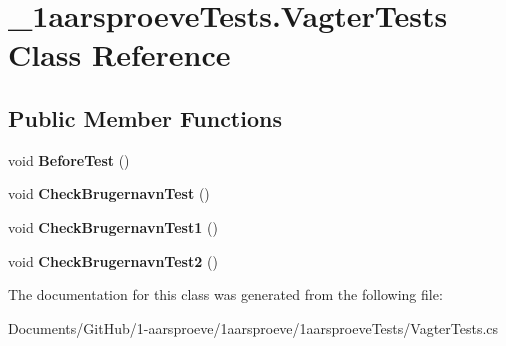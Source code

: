 \hypertarget{class__1aarsproeve_tests_1_1_vagter_tests}{}\section{\+\_\+1aarsproeve\+Tests.\+Vagter\+Tests Class Reference}
\label{class__1aarsproeve_tests_1_1_vagter_tests}
\subsection*{Public Member Functions}
\begin{DoxyCompactItemize}
\item 
\hypertarget{class__1aarsproeve_tests_1_1_vagter_tests_a2771308ae25fb3a3eda094c194c02466}{}void {\bfseries Before\+Test} ()\label{class__1aarsproeve_tests_1_1_vagter_tests_a2771308ae25fb3a3eda094c194c02466}

\item 
\hypertarget{class__1aarsproeve_tests_1_1_vagter_tests_a6925d5dfb2a8b7924ae3d6348a4a305a}{}void {\bfseries Check\+Brugernavn\+Test} ()\label{class__1aarsproeve_tests_1_1_vagter_tests_a6925d5dfb2a8b7924ae3d6348a4a305a}

\item 
\hypertarget{class__1aarsproeve_tests_1_1_vagter_tests_ae442c9c3c0fd30ee62ab7b8c2bec9bcb}{}void {\bfseries Check\+Brugernavn\+Test1} ()\label{class__1aarsproeve_tests_1_1_vagter_tests_ae442c9c3c0fd30ee62ab7b8c2bec9bcb}

\item 
\hypertarget{class__1aarsproeve_tests_1_1_vagter_tests_a9c51a021b0442026774f3491810d17f2}{}void {\bfseries Check\+Brugernavn\+Test2} ()\label{class__1aarsproeve_tests_1_1_vagter_tests_a9c51a021b0442026774f3491810d17f2}

\end{DoxyCompactItemize}


The documentation for this class was generated from the following file\+:\begin{DoxyCompactItemize}
\item 
Documents/\+Git\+Hub/1-\/aarsproeve/1aarsproeve/1aarsproeve\+Tests/Vagter\+Tests.\+cs\end{DoxyCompactItemize}

